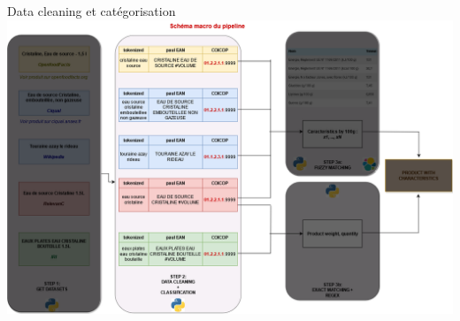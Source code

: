 \documentclass[ignorenonframetext,]{beamer}
\begin{document}
\begin{frame}{Data cleaning et catégorisation}
\includegraphics[width = \linewidth]{images/macro-ombre2.png}
\end{frame}
\end{document}
